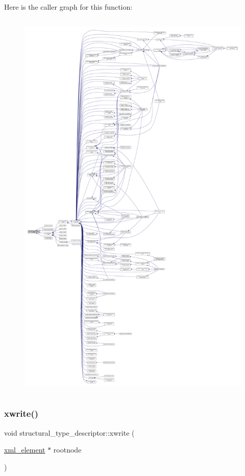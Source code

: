 Here is the caller graph for this function\+:
\nopagebreak
\begin{figure}[H]
\begin{center}
\leavevmode
\includegraphics[height=550pt]{dc/da4/structstructural__type__descriptor_aa884cd403a3f82933f4969e0250cc5ff_icgraph}
\end{center}
\end{figure}
\mbox{\label{structstructural__type__descriptor_ad0fc728cbbedbabdd23bb2e9e749b89c}} 
\subsubsection{\texorpdfstring{xwrite()}{xwrite()}}
{\footnotesize\ttfamily void structural\+\_\+type\+\_\+descriptor\+::xwrite (\begin{DoxyParamCaption}\item[{\hyperlink{classxml__element}{xml\+\_\+element} $\ast$}]{rootnode }\end{DoxyParamCaption})}



